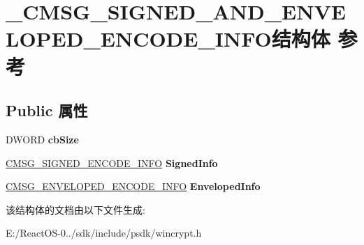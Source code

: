 \hypertarget{struct___c_m_s_g___s_i_g_n_e_d___a_n_d___e_n_v_e_l_o_p_e_d___e_n_c_o_d_e___i_n_f_o}{}\section{\+\_\+\+C\+M\+S\+G\+\_\+\+S\+I\+G\+N\+E\+D\+\_\+\+A\+N\+D\+\_\+\+E\+N\+V\+E\+L\+O\+P\+E\+D\+\_\+\+E\+N\+C\+O\+D\+E\+\_\+\+I\+N\+F\+O结构体 参考}
\label{struct___c_m_s_g___s_i_g_n_e_d___a_n_d___e_n_v_e_l_o_p_e_d___e_n_c_o_d_e___i_n_f_o}
\subsection*{Public 属性}
\begin{DoxyCompactItemize}
\item 
\mbox{\label{struct___c_m_s_g___s_i_g_n_e_d___a_n_d___e_n_v_e_l_o_p_e_d___e_n_c_o_d_e___i_n_f_o_a4bba92b5fcbaafb01377e74666f2ac43}} 
D\+W\+O\+RD {\bfseries cb\+Size}
\item 
\mbox{\label{struct___c_m_s_g___s_i_g_n_e_d___a_n_d___e_n_v_e_l_o_p_e_d___e_n_c_o_d_e___i_n_f_o_a6563a2d93be7bda7b2ab3041cb9dca90}} 
\hyperlink{struct___c_m_s_g___s_i_g_n_e_d___e_n_c_o_d_e___i_n_f_o}{C\+M\+S\+G\+\_\+\+S\+I\+G\+N\+E\+D\+\_\+\+E\+N\+C\+O\+D\+E\+\_\+\+I\+N\+FO} {\bfseries Signed\+Info}
\item 
\mbox{\label{struct___c_m_s_g___s_i_g_n_e_d___a_n_d___e_n_v_e_l_o_p_e_d___e_n_c_o_d_e___i_n_f_o_a1cfca5c815b97d370449d7cd9dfcd8d5}} 
\hyperlink{struct___c_m_s_g___e_n_v_e_l_o_p_e_d___e_n_c_o_d_e___i_n_f_o}{C\+M\+S\+G\+\_\+\+E\+N\+V\+E\+L\+O\+P\+E\+D\+\_\+\+E\+N\+C\+O\+D\+E\+\_\+\+I\+N\+FO} {\bfseries Enveloped\+Info}
\end{DoxyCompactItemize}


该结构体的文档由以下文件生成\+:\begin{DoxyCompactItemize}
\item 
E\+:/\+React\+O\+S-\/0../sdk/include/psdk/wincrypt.\+h\end{DoxyCompactItemize}
